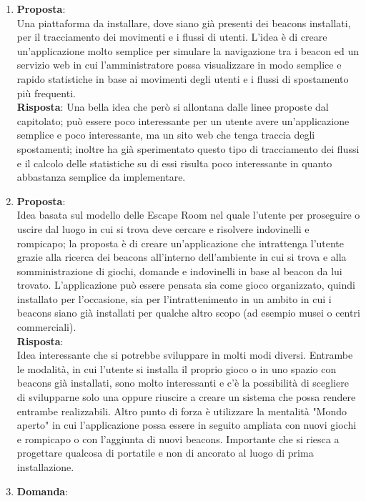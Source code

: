 \documentclass[a4paper,titlepage]{article}
\begin{document}
\begin{enumerate}
  \item \textbf{Proposta}: \\
  Una piattaforma da installare, dove siano già presenti dei beacons installati, per il tracciamento dei movimenti e i flussi di utenti. L'idea è di creare un'applicazione molto semplice per simulare la navigazione tra i beacon ed un servizio web in cui l'amministratore possa visualizzare in modo semplice e rapido statistiche in base ai movimenti degli utenti e i flussi di spostamento più frequenti. \\
  \textbf{Risposta}:
  Una bella idea che però si allontana dalle linee proposte dal capitolato; 
  può essere poco interessante per un utente avere un'applicazione semplice e poco interessante, ma un sito web che tenga traccia degli spostamenti; inoltre \PROPONENTE{} ha già sperimentato questo tipo di tracciamento dei flussi e il calcolo delle statistiche su di essi risulta poco interessante in quanto abbastanza semplice da implementare.
  \item \textbf{Proposta}: \\
  Idea basata sul modello delle Escape Room nel quale l'utente per proseguire o uscire dal luogo in cui si trova deve cercare e risolvere indovinelli e rompicapo; la proposta è di creare un'applicazione che intrattenga l'utente grazie alla ricerca dei beacons all'interno dell'ambiente in cui si trova e alla somministrazione di giochi, domande e indovinelli in base al beacon da lui trovato. L'applicazione può essere pensata sia come gioco organizzato, quindi installato per l'occasione, sia per l'intrattenimento in un ambito in cui i beacons siano già installati per qualche altro scopo (ad esempio musei o centri commerciali).\\
  \textbf{Risposta}: \\
  Idea interessante che si potrebbe sviluppare in molti modi diversi. Entrambe le modalità, in cui l'utente si installa il proprio gioco o in uno spazio con beacons già installati, sono molto interessanti e c'è la possibilità di scegliere di svilupparne solo una oppure riuscire a creare un sistema che possa rendere entrambe realizzabili. Altro punto di forza è utilizzare la mentalità "Mondo aperto" in cui l'applicazione possa essere in seguito ampliata con nuovi giochi e rompicapo o con l'aggiunta di nuovi beacons. Importante che si riesca a progettare qualcosa di portatile e non di ancorato al luogo di prima installazione.
  \item \textbf{Domanda}:\\

\end{enumerate}
\end{document}
